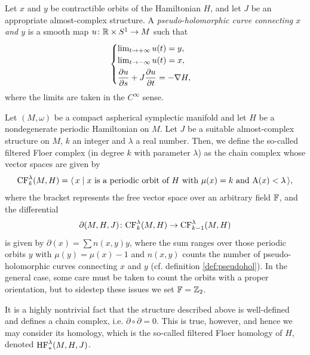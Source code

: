 \begin{itemize}
\begin{definition}\label{def:pseudohol}
Let $x$ and $y$ be contractible orbits of the Hamiltonian $H$, and let $J$ be an appropriate almost-complex structure. A \emph{pseudo-holomorphic curve connecting $x$ and $y$} is a smooth map $u \colon \mathbb{R} \times S^1 \to M$ such that
\begin{equation}
\begin{cases}
\lim_{t \to +\infty} u(t) = y,\\
\lim_{t \to -\infty} u(t) = x,\\[0.1cm]
\displaystyle \diffp u s + J \diffp u t = - \grad H,
\end{cases}
\end{equation}
where the limits are taken in the $C^\infty$ sense.
\end{definition}
\end{itemize}

\begin{definition}
Let $(M,\omega)$ be a compact aspherical symplectic manifold and let $H$ be a nondegenerate periodic Hamiltonian on $M$. Let $J$ be a suitable almost-complex structure on $M$, $k$ an integer and $\lambda$ a real number. Then, we define the so-called filtered Floer complex (in degree $k$ with parameter $\lambda$) as the chain complex whose vector spaces are given by
\begin{equation}
\mathrm{CF}_k^\lambda(M, H) = \langle\, x \mid \text{$x$ is a periodic orbit of $H$ with $\mu(x) = k$ and $\mathrm{A}(x) < \lambda$}\,\rangle,
\end{equation}
where the bracket represents the free vector space over an arbitrary field $\mathbb{F}$, and the differential
\begin{equation}
\partial(M,H,J) \colon \mathrm{CF}_k^\lambda(M,H) \to \mathrm{CF}_{k-1}^\lambda(M,H)
\end{equation}
is given by $\partial(x) = \sum n(x,y) y$, where the sum ranges over those periodic orbits $y$ with $\mu(y) = \mu(x) - 1$ and $n(x,y)$ counts the number of pseudo-holomorphic curves connecting $x$ and $y$ (cf. definition \ref{def:pseudohol}). In the general case, some care must be taken to count the orbits with a proper orientation, but to sidestep these issues we set $\mathbb{F} = \mathbb{Z}_2$.

It is a highly nontrivial fact that the structure described above is well-defined and defines a chain complex, i.e. $\partial \circ \partial = 0$. This is true, however, and hence we may consider its homology, which is the so-called filtered Floer homology of $H$, denoted $\mathrm{HF}_*^\lambda(M,H,J)$.
\end{definition}

